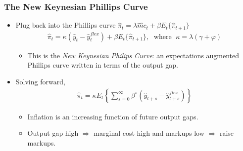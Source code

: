 \documentclass[english,xcolor=svgnames]{beamer}
\begin{document}
%


\begin{frame}
\frametitle{The New Keynesian Phillips Curve
}
\begin{itemize}
	\item Plug back into the Phillips curve $\hat{\pi}_t=\lambda\hat{mc}_{t}+\beta E_t\{\hat{\pi}_{t+1}\}$
	\begin{align*}
		\hat{\pi}_t=\kappa(\hat{y}_t-\hat{y}_t^{flex})+\beta E_t\{\hat{\pi}_{t+1}\},\;\text{ where }\;\kappa=\lambda(\gamma+\varphi)
\end{align*}
	\begin{itemize}
		\item This is the \emph{New Keynesian Philips Curve}: an expectations augmented Phillips curve written in terms of the output gap.
	\end{itemize}
	\item Solving forward,
	\begin{align*}
		\hat{\pi}_t=\kappa E_t\left\{\sum_{s=0}^{\infty}\beta^s(\hat{y}_{t+s}-\hat{y}_{t+s}^{flex})\right\}
	\end{align*}
	\begin{itemize}
		\item Inflation is an increasing function of future output gaps.
		\item Output gap high $\Rightarrow$ marginal cost high and markups low $\Rightarrow$ raise markups.
	\end{itemize}
\end{itemize}
\end{frame}
\end{document}
